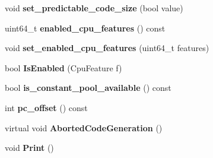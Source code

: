 \begin{DoxyCompactItemize}
\item 
void {\bfseries set\+\_\+predictable\+\_\+code\+\_\+size} (bool value)\hypertarget{classv8_1_1internal_1_1_assembler_base_a8fb65d4cafef633546c2143aac9d090d}{}\label{classv8_1_1internal_1_1_assembler_base_a8fb65d4cafef633546c2143aac9d090d}

\item 
uint64\+\_\+t {\bfseries enabled\+\_\+cpu\+\_\+features} () const \hypertarget{classv8_1_1internal_1_1_assembler_base_a4037253a85548558ccb31c87f27c8401}{}\label{classv8_1_1internal_1_1_assembler_base_a4037253a85548558ccb31c87f27c8401}

\item 
void {\bfseries set\+\_\+enabled\+\_\+cpu\+\_\+features} (uint64\+\_\+t features)\hypertarget{classv8_1_1internal_1_1_assembler_base_a042d7907d4097ff5f4bc4cb0685b47a7}{}\label{classv8_1_1internal_1_1_assembler_base_a042d7907d4097ff5f4bc4cb0685b47a7}

\item 
bool {\bfseries Is\+Enabled} (Cpu\+Feature f)\hypertarget{classv8_1_1internal_1_1_assembler_base_a1eaf5b9a9d0998b6bc3104cf32c08d7c}{}\label{classv8_1_1internal_1_1_assembler_base_a1eaf5b9a9d0998b6bc3104cf32c08d7c}

\item 
bool {\bfseries is\+\_\+constant\+\_\+pool\+\_\+available} () const \hypertarget{classv8_1_1internal_1_1_assembler_base_a6634b86a7e1b02404e5c53a8f540e822}{}\label{classv8_1_1internal_1_1_assembler_base_a6634b86a7e1b02404e5c53a8f540e822}

\item 
int {\bfseries pc\+\_\+offset} () const \hypertarget{classv8_1_1internal_1_1_assembler_base_a956cd6617b0ebddba1df67bfe6b138cd}{}\label{classv8_1_1internal_1_1_assembler_base_a956cd6617b0ebddba1df67bfe6b138cd}

\item 
virtual void {\bfseries Aborted\+Code\+Generation} ()\hypertarget{classv8_1_1internal_1_1_assembler_base_aa5bf23c158a9df7762e8529aeda8e25e}{}\label{classv8_1_1internal_1_1_assembler_base_aa5bf23c158a9df7762e8529aeda8e25e}

\item 
void {\bfseries Print} ()\hypertarget{classv8_1_1internal_1_1_assembler_base_a7cdac86bb62fa1d385a6c180146674e7}{}\label{classv8_1_1internal_1_1_assembler_base_a7cdac86bb62fa1d385a6c180146674e7}

\end{DoxyCompactItemize}
